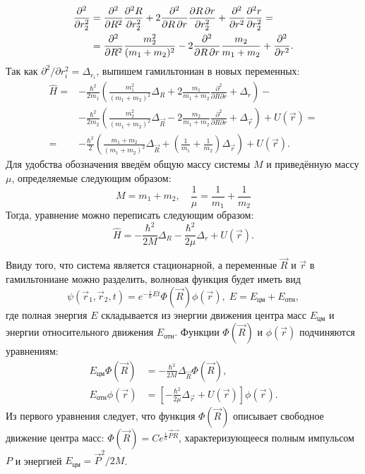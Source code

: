 \begin{align*}
  \frac{\partial^2}{\partial r_2^2} &= \frac{\partial^2}{\partial R^2} \frac{\partial^2 R}{\partial r_2^2} + 2\frac{\partial^2}{\partial R\,\partial r}\frac{\partial R\,\partial r}{\partial r_2^2} + \frac{\partial^2}{\partial r^2} \frac{\partial^2 r}{\partial r_2^2} = \\
  & = \frac{\partial^2}{\partial R^2} \frac{m_2^2}{(m_1 + m_2)^2} - 2\frac{\partial^2} {\partial R\,\partial r} \frac{m_2}{m_1 + m_2} + \frac{\partial^2}{\partial r^2}.
\end{align*}
Так как $\partial^2/\partial r_i^2 = \Delta_{r_i}$, выпишем гамильтониан в
новых переменных:
\begin{align*}
  \hat{H} = &-\frac{\hbar^2}{2m_1}\left(\frac{m_1^2}{(m_1 + m_2)^2}\Delta_{R} + 2\frac{m_1}{m_1 + m_2}\frac{\partial^2}{\partial R \partial r} + \Delta_{r}\right) - \\
  & -\frac{\hbar^2}{2m_2}\left(\frac{m_2^2}{(m_1 + m_2)^2} \Delta_{\Vec{R}} - 2\frac{m_2}{m_1 + m_2} \frac{\partial^2}{\partial R \partial r} + \Delta_{\Vec{r}}\right) + U(\Vec{r}) = \\
  = & -\frac{\hbar^2}{2}\left(\frac{m_1 + m_2}{(m_1 + m_2)^2}\Delta_{\Vec{R}} + \left(\frac{1}{m_1} + \frac{1}{m_2}\right)\Delta_{\Vec{r}}\right) + U(\Vec{r}).
\end{align*}
Для удобства обозначения введём общую массу системы $M$ и приведённую массу
$\mu$, определяемые следующим образом:
\[
  M = m_1 + m_2, \quad \frac{1}{\mu} = \frac{1}{m_1} + \frac{1}{m_2}
\]
Тогда, уравнение можно переписать следующим образом:
\[
  \hat{H} = -\frac{\hbar^2}{2M}\Delta_{R} - \frac{\hbar^2}{2\mu}\Delta_{r} + U(\Vec{r}).
\]

Ввиду того, что система является стационарной, а переменные $\Vec{R}$ и
$\Vec{r}$ в гамильтониане можно разделить, волновая функция будет иметь вид
\[
  \psi(\Vec{r}_1, \Vec{r}_2, t) = e^{-\frac{i}{\hbar}Et}\Phi(\Vec{R})\phi(\Vec{r}), \; E = E_{\text{цм}} + E_{\text{отн}},
\]
где полная энергия $E$ складывается из энергии движения центра масс
$E_{\text{цм}}$ и энергии относительного движения $E_{\text{отн}}$. Функции
$\Phi(\Vec{R})$ и $\phi(\Vec{r})$ подчиняются уравнениям:
\begin{align*}
  E_{\text{цм}}\Phi(\Vec{R}) &=-\frac{\hbar^2}{2M}\Delta_{\Vec{R}}\Phi(\Vec{R}), \\
  E_{\text{отн}}\phi(\Vec{r}) &= \left[-\frac{\hbar^2}{2\mu}\Delta_{\Vec{r}} + U(\Vec{r})\right]\phi(\Vec{r}).
\end{align*}
Из первого уравнения следует, что функция $\Phi(\Vec{R})$ описывает свободное
движение центра масс: $\Phi(\Vec{R}) = Ce^{\frac{i}{\hbar}\Vec{P}\Vec{R}}$,
характеризующееся полным импульсом $P$ и энергией $E_{\text{цм}} =
  \Vec{P}^2/2M$.
\qedsq

